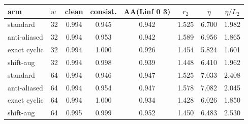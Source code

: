 \begin{tabular}{ll cc c ccc}
\toprule
arm & $w$ & clean & consist. & AA(Linf 0 3) & $r_2$ & $\eta$ & $\eta/L_2$ \\
\midrule
standard & 32 & 0.994 & 0.945 & 0.942 & 1.525 & 6.700 & 1.982 \\
anti-aliased & 32 & 0.994 & 0.953 & 0.942 & 1.589 & 6.956 & 1.865 \\
exact cyclic & 32 & 0.994 & 1.000 & 0.926 & 1.454 & 5.824 & 1.601 \\
shift-aug & 32 & 0.994 & 0.998 & 0.939 & 1.448 & 6.410 & 1.962 \\
\midrule
standard & 64 & 0.994 & 0.946 & 0.947 & 1.525 & 7.033 & 2.408 \\
anti-aliased & 64 & 0.994 & 0.954 & 0.947 & 1.578 & 7.082 & 2.045 \\
exact cyclic & 64 & 0.994 & 1.000 & 0.934 & 1.428 & 6.026 & 1.850 \\
shift-aug & 64 & 0.995 & 0.999 & 0.952 & 1.450 & 6.483 & 2.530 \\
\bottomrule
\end{tabular}
